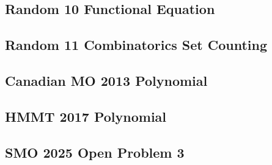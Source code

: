 \subsection{Random 10 Functional Equation}

\newpage

\subsection{Random 11 Combinatorics Set Counting}

\newpage

\subsection{Canadian MO 2013 Polynomial}

\newpage

\subsection{HMMT 2017 Polynomial}


\subsection{SMO 2025 Open Problem 3}

